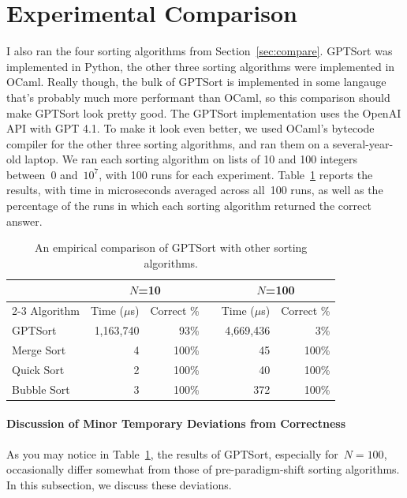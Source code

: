 \documentclass[sigconf]{acmart}\settopmatter{printfolios=false,printccs=false,printacmref=false}
\theoremstyle{definition}
\begin{document}
\section{Experimental Comparison}
I also ran the four sorting algorithms from Section~\ref{sec:compare}.
%
GPTSort was implemented in Python, the other three sorting algorithms were
implemented in OCaml.
%
Really though, the bulk of GPTSort is implemented in some langauge that's
probably much more performant than OCaml, so this comparison should make
GPTSort look pretty good.
%
The GPTSort implementation uses the OpenAI API with GPT 4.1.
%
To make it look even better, we used OCaml's bytecode compiler for the other
three sorting algorithms, and ran them on a several-year-old laptop.
%
We ran each sorting algorithm on lists of 10 and 100 integers between~0
and~$10^7$, with 100 runs for each experiment.
%
Table~\ref{tab:exp-compare} reports the results, with time in microseconds
averaged across all~100 runs, as well as the percentage of the runs in which
each sorting algorithm returned the correct answer.

\begin{table}
  \begin{tabular}{l r r l r r}
    \toprule
    & \multicolumn{2}{c}{$N$=10} & & \multicolumn{2}{c}{$N$=100}  \\
    \cmidrule{2-3} \cmidrule{5-6}
    Algorithm & Time ($\mu$s) & Correct \% & & Time ($\mu$s) & Correct \%\\
    \midrule
    GPTSort & 1,163,740 & 93\% & & 4,669,436 & 3\%\\
    Merge Sort & 4 & 100\% & & 45 & 100\%\\
    Quick Sort & 2 & 100\% & & 40 & 100\%\\
    Bubble Sort & 3 & 100\% & & 372 & 100\%\\
      \bottomrule
  \end{tabular}
  \caption{An empirical comparison of GPTSort with other sorting algorithms.}
  \label{tab:exp-compare}
\end{table}

\paragraph{Discussion of Minor Temporary Deviations from Correctness}
As you may notice in Table~\ref{tab:exp-compare}, the results of GPTSort,
especially for~$N=100$, occasionally differ somewhat from those of
pre-paradigm-shift sorting algorithms.
%
In this subsection, we discuss these deviations.
\end{document}
